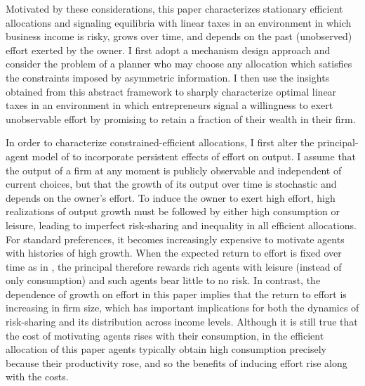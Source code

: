 \documentclass[11pt]{article}
\theoremstyle{plain}
\begin{document}
Motivated by these considerations, this paper characterizes stationary efficient allocations and signaling equilibria with linear taxes in an environment in which business income is risky, grows over time, and depends on the past (unobserved) effort exerted by the owner. I first adopt a mechanism design approach and consider the problem of a planner who may choose any allocation which satisfies the constraints imposed by asymmetric information. I then use the insights obtained from this abstract framework to sharply characterize optimal linear taxes in an environment in which entrepreneurs signal a willingness to exert unobservable effort by promising to retain a fraction of their wealth in their firm. 

In order to characterize constrained-efficient allocations, I first alter the principal-agent model of \cite{sannikov_continuous-time_2008} to incorporate persistent effects of effort on output. I assume that the output of a firm at any moment is publicly observable and independent of current choices, but that the growth of its output over time is stochastic and depends on the owner's effort. To induce the owner to exert high effort, high realizations of output growth must be followed by either high consumption or leisure, leading to imperfect risk-sharing and inequality in all efficient allocations. For standard preferences, it becomes increasingly expensive to motivate agents with histories of high growth. When the expected return to effort is fixed over time as in \cite{sannikov_continuous-time_2008}, the principal therefore rewards rich agents with leisure (instead of only consumption) and such agents bear little to no risk. In contrast, the dependence of growth on effort in this paper implies that the return to effort is increasing in firm size, which has important implications for both the dynamics of risk-sharing and its distribution across income levels. Although it is still true that the cost of motivating agents rises with their consumption, in the efficient allocation of this paper agents typically obtain high consumption precisely because their productivity rose, and so the benefits of inducing effort rise along with the costs. 
 
\end{document}
